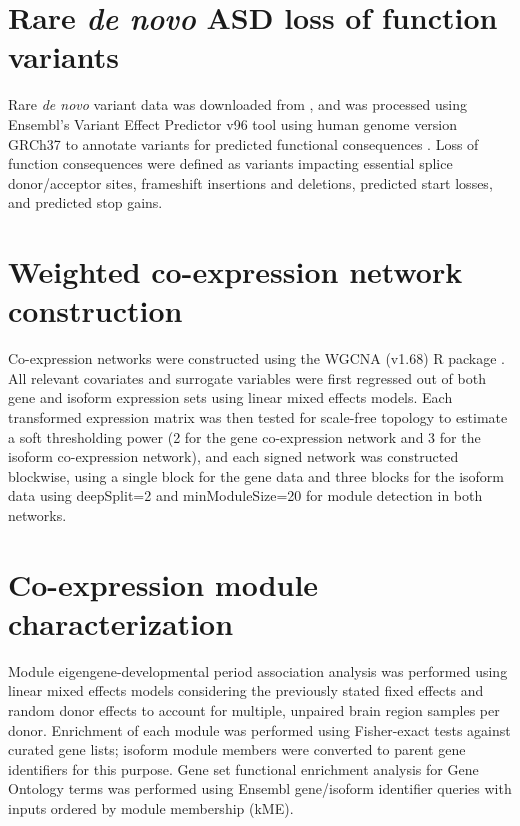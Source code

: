 \documentclass[12pt,chapterheads,final]{ucsd}
\begin{document}
\section{Rare \textit{de novo} ASD loss of function variants}
Rare \textit{de novo} variant data was downloaded from \cite{Satterstrom2019}, and was processed using Ensembl's Variant Effect Predictor v96 tool using human genome version GRCh37 to annotate variants for predicted functional consequences \cite{McLaren2016}. Loss of function consequences were defined as variants impacting essential splice donor/acceptor sites, frameshift insertions and deletions, predicted start losses, and predicted stop gains. 

\section{Weighted co-expression network construction}
Co-expression networks were constructed using the WGCNA (v1.68) R package \cite{Langfelder2008}. All relevant covariates and surrogate variables were first regressed out of both gene and isoform expression sets using linear mixed effects models. Each transformed expression matrix was then tested for scale-free topology to estimate a soft thresholding power (2 for the gene co-expression network and 3 for the isoform co-expression network), and each signed network was constructed blockwise, using a single block for the gene data and three blocks for the isoform data using deepSplit=2 and minModuleSize=20 for module detection in both networks.

\section{Co-expression module characterization}
Module eigengene-developmental period association analysis was performed using linear mixed effects models considering the previously stated fixed effects and random donor effects to account for multiple, unpaired brain region samples per donor. Enrichment of each module was performed using Fisher-exact tests against curated gene lists; isoform module members were converted to parent gene identifiers for this purpose. Gene set functional enrichment analysis for Gene Ontology terms was performed using Ensembl gene/isoform identifier queries with inputs ordered by module membership (kME).\par
\end{document}
